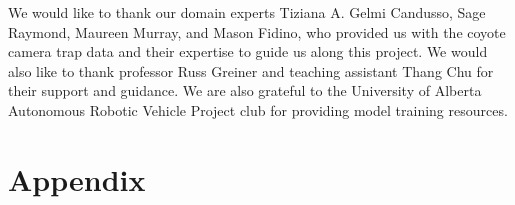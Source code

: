 \documentclass{article}
\begin{document}
\clearpage

\acksection{}
\label{sec:acknowledgements}
We would like to thank our domain experts Tiziana A. Gelmi Candusso, Sage
Raymond, Maureen Murray, and Mason Fidino, who provided us with the coyote
camera trap data and their expertise to guide us along this project. We
would also like to thank professor Russ Greiner and teaching assistant Thang Chu for their support and guidance. We are also grateful to the
University of Alberta Autonomous Robotic Vehicle Project club for providing model training resources.




\clearpage

\appendix
\section{Appendix}
\end{document}
